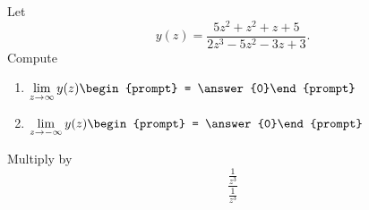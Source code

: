 \documentclass[handout]{ximera}
\begin{document}
\begin{exercise}
Let 
\[
y(z) = \frac{5 z^2+z^2+z+5}{2 z^3-5 z^2-3 z+3}.
\]
Compute
\begin{enumerate}
\item $\displaystyle\lim_{z\to \infty} y(z) \begin{prompt} = \answer{0}\end{prompt}$
\item $\displaystyle\lim_{z\to -\infty}y(z) \begin{prompt} = \answer{0}\end{prompt}$
\end{enumerate}
\begin{hint}
Multiply by
\[
\frac{\frac{1}{z^3}}{\frac{1}{z^3}}
\]
\end{hint}
\end{exercise}
\end{document}

